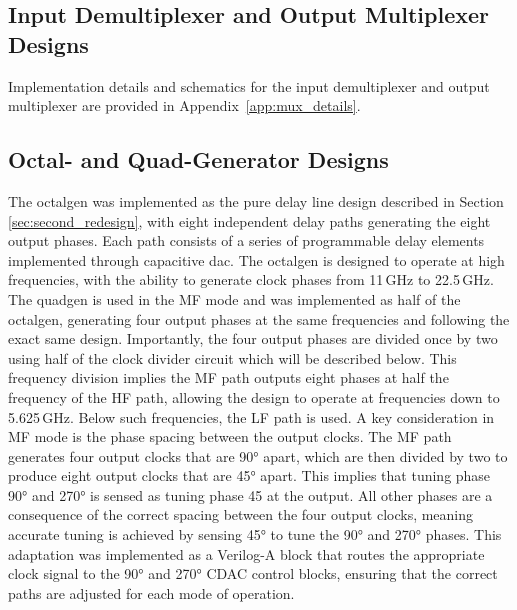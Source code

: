 \subsection*{Input Demultiplexer and Output Multiplexer Designs}\label{sec:demux_mux_design}
Implementation details and schematics for the input demultiplexer and output multiplexer are provided in Appendix~\ref{app:mux_details}.
\subsection{Octal- and Quad-Generator Designs}\label{sec:octal_quad_gen_design}
The \gls{octalgen} was implemented as the pure delay line design described in Section \ref{sec:second_redesign}, with eight independent delay paths generating the eight output phases. Each path consists of a series of programmable delay elements implemented through capacitive \gls{dac}. The \gls{octalgen} is designed to operate at high frequencies, with the ability to generate clock phases from 11\,GHz to 22.5\,GHz. 
The \gls{quadgen} is used in the MF mode and was implemented as half of the \gls{octalgen}, generating four output phases at the same frequencies and following the exact same design. Importantly, the four output phases are divided once by two using half of the clock divider circuit which will be described below. This frequency division implies the MF path outputs eight phases at half the frequency of the HF path, allowing the design to operate at frequencies down to 5.625\,GHz. Below such frequencies, the LF path is used.
A key consideration in MF mode is the phase spacing between the output clocks. The MF path generates four output clocks that are \ang{90} apart, which are then divided by two to produce eight output clocks that are \ang{45} apart. This implies that tuning phase \ang{90} and \ang{270} is sensed as tuning phase 45 at the output. All other phases are a consequence of the correct spacing between the four output clocks, meaning accurate tuning is achieved by sensing \ang{45} to tune the \ang{90} and \ang{270} phases. This adaptation was implemented as a Verilog-A block that routes the appropriate clock signal to the \ang{90} and \ang{270} CDAC control blocks, ensuring that the correct paths are adjusted for each mode of operation.
